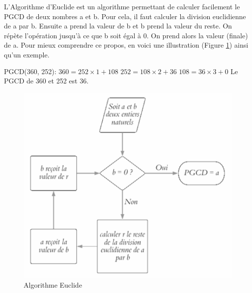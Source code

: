 \begin{definition} \normalfont
L'Algorithme d'Euclide est un algorithme permettant de calculer facilement le PGCD de deux nombres a et b. Pour cela, il faut calculer la division euclidienne de a par b. Ensuite a prend la valeur de b et b prend la valeur du reste. On répète l'opération jusqu'à ce que b soit égal à 0. On prend alors la valeur (finale) de a. \newline
Pour mieux comprendre ce propos, en voici une illustration (Figure \ref{fig:euclide}) ainsi qu'un exemple.

\begin{example} \normalfont
PGCD(360, 252): \newline
$360 = 252 \times 1 + 108$ \newline
$252 = 108 \times 2 + 36$ \newline
$108 = 36 \times 3 + 0$ \newline
Le PGCD de 360 et 252 est 36.
\end{example}

\begin{figure}[h]
    \centering
    \includegraphics[scale=0.5]{algo.jpg}
    \caption{Algorithme Euclide}
    \label{fig:euclide}
\end{figure}

\end{definition}